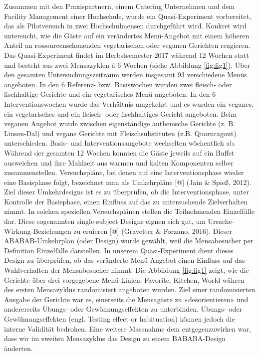 \documentclass[12pt,ngerman,]{article}
\begin{document}
Zusammen mit den Praxispartnern, einem Catering Unternehmen und dem
Facility Management einer Hochschule, wurde ein Quasi-Experiment
vorbereitet, das als Pilotversuch in zwei Hochschulmensen durchgeführt
wird. Konkret wird untersucht, wie die Gäste auf ein verändertes
Menü-Angebot mit einem höheren Anteil an ressourcenschonenden
vegetarischen oder veganen Gerichten reagieren. Das Quasi-Experiment
findet im Herbstsemester 2017 während 12 Wochen statt und besteht aus
zwei Mensazyklen à 6 Wochen (siehe Abbildung \ref{fig:fig1}). Über den
gesamten Untersuchungszeitraum werden insgesamt 93 verschiedene Menüs
angeboten. In den 6 Referenz- bzw. Basiswochen wurden zwei fleisch- oder
fischhaltige Gerichte und ein vegetarisches Menü angeboten. In den 6
Interventionswochen wurde das Verhältnis umgekehrt und es wurden ein
veganes, ein vegetarisches und ein fleisch- oder fischhaltiges Gericht
angeboten. Beim veganen Angebot wurde zwischen eigenständige authenische
Gerichte (z. B. Linsen-Dal) und vegane Gerichte mit Fleischsubstituten
(z.B. Quornragout) unterschieden. Basis- und Interventionsangebote
wechselten wöchentlich ab. Während der gesamten 12 Wochen konnten die
Gäste jeweils auf ein Buffet ausweichen und ihre Mahlzeit aus warmen und
kalten Komponenten selber zusammenstellen. Versuchspläne, bei denen auf
eine Interventionsphase wieder eine Basisphase folgt, bezeichnet man als
Umkehrpläne {[}@{]} (Jain \& Spieß, 2012). Ziel dieser Umkehrdesigns ist
es zu überprüfen, ob die Interventionsphase, unter Kontrolle der
Basisphase, einen Einfluss auf das zu untersuchende Zielverhalten nimmt.
In solchen speziellen Versuchsplänen stellen die Teilnehmenden
Einzelfälle dar. Diese sogenannten single-subject Designs eignen sich
gut, um Ursache-Wirkung-Beziehungen zu eruieren {[}@{]} (Gravetter \&
Forzano, 2016). Dieser ABABAB-Umkehrplan (oder Design) wurde gewählt,
weil die Mensabesucher per Definition Einzelfälle darstellen. In unserem
Quasi-Experiment dient dieses Design zu überprüfen, ob das veränderte
Menü-Angebot einen Einfluss auf das Wahlverhalten der Mensabesucher
nimmt. Die Abbildung \ref{fig:fig1} zeigt, wie die Gerichte über drei
vorgegebene Menü-Linien: Favorite, Kitchen, World währen des ersten
Mensazyklus randomisiert angeboten wurden. Ziel einer randomisierten
Ausgabe der Gerichte war es, einerseits die Mensagäste zu
«desorientieren» und andererseits Übungs- oder Gewöhnungseffekten zu
unterbinden. Übungs- oder Gewöhnungseffekten (engl. Testing effect or
habituation) können jedoch die interne Validität bedrohen. Eine weitere
Massnahme dem entgegenzuwirken war, dass wir im zweiten Mensazyklus das
Design zu einem BABABA-Design änderten.
\end{document}
